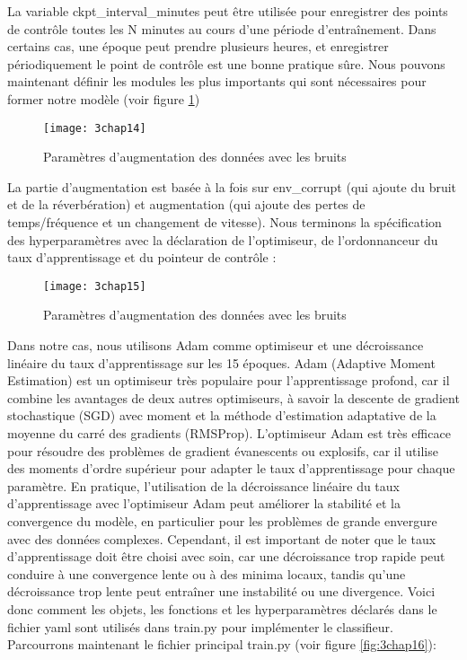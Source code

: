 La variable ckpt\_interval\_minutes peut être utilisée pour enregistrer des points de contrôle toutes les N minutes au cours d'une période d'entraînement. Dans certains cas, une époque peut prendre plusieurs heures, et enregistrer périodiquement le point de contrôle est une bonne pratique sûre.  
Nous pouvons maintenant définir les modules les plus importants qui sont nécessaires pour former notre modèle (voir figure \ref{fig:3chap14})

\begin{figure}[h]
	\centering
	\texttt{[image: 3chap14]}
	\caption{Paramètres d'augmentation des données avec les bruits}
	\label{fig:3chap14}
\end{figure}

La partie d'augmentation est basée à la fois sur env\_corrupt (qui ajoute du bruit et de la réverbération) et augmentation (qui ajoute des pertes de temps/fréquence et un changement de vitesse). 
Nous terminons la spécification des hyperparamètres avec la déclaration de l'optimiseur, de l'ordonnanceur du taux d'apprentissage et du pointeur de contrôle :
\begin{figure}[h]
	\centering
	\texttt{[image: 3chap15]}
	\caption{Paramètres d'augmentation des données avec les bruits}
	\label{fig:3chap15}
\end{figure}

Dans notre  cas, nous utilisons Adam comme optimiseur et une décroissance linéaire du taux d'apprentissage sur les 15 époques.
Adam (Adaptive Moment Estimation) est un optimiseur très populaire pour l'apprentissage profond, car il combine les avantages de deux autres optimiseurs, à savoir la descente de gradient stochastique (SGD) avec moment et la méthode d'estimation adaptative de la moyenne du carré des gradients (RMSProp). L'optimiseur Adam est très efficace pour résoudre des problèmes de gradient évanescents ou explosifs, car il utilise des moments d'ordre supérieur pour adapter le taux d'apprentissage pour chaque paramètre.
En pratique, l'utilisation de la décroissance linéaire du taux d'apprentissage avec l'optimiseur Adam peut améliorer la stabilité et la convergence du modèle, en particulier pour les problèmes de grande envergure avec des données complexes. Cependant, il est important de noter que le taux d'apprentissage doit être choisi avec soin, car une décroissance trop rapide peut conduire à une convergence lente ou à des minima locaux, tandis qu'une décroissance trop lente peut entraîner une instabilité ou une divergence.
Voici donc comment les objets, les fonctions et les hyperparamètres déclarés dans le fichier yaml sont utilisés dans train.py pour implémenter le classifieur.
Parcourrons maintenant le fichier principal train.py (voir figure \ref{fig:3chap16}):

